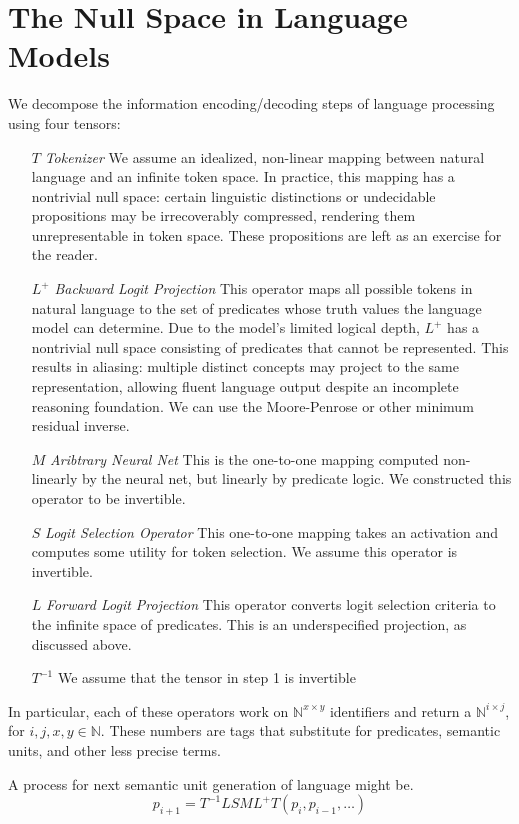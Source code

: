 \documentclass[12pt]{article}
\theoremstyle{plain}
\begin{document}
\section{The Null Space in Language Models}
We decompose the information encoding/decoding steps of language processing
using four tensors:
\begin{enumerate}
\item[$T$] \emph{Tokenizer} We assume an idealized, non-linear mapping 
 between natural language and an infinite token space. In practice, this 
 mapping has a nontrivial null space: certain linguistic distinctions or 
undecidable propositions may be irrecoverably compressed, rendering them 
unrepresentable in token space.  These propositions are left as an
        exercise for the reader.
    \item[$L^+$] \emph{Backward Logit Projection} This operator maps all 
        possible tokens in natural language to the set of 
predicates whose truth values the language model can determine. Due to the model’s 
limited logical depth, $L^+$ has a nontrivial null space consisting of predicates 
that cannot be represented. This results in aliasing: multiple distinct concepts may 
project to the same representation, allowing fluent language output despite an 
incomplete reasoning foundation. We can use the Moore-Penrose or other minimum residual inverse.
    \item[$M$] \emph{Aribtrary Neural Net} This is the one-to-one mapping computed non-linearly by the neural net, 
    but linearly by predicate logic.  We constructed this operator to be invertible.
\item[$S$] \emph{Logit Selection Operator} This one-to-one mapping takes an activation and computes some utility for 
    token selection.  We assume this operator is invertible.
\item[$L$] \emph{Forward Logit Projection}  This operator converts logit selection criteria to the
    infinite space of predicates. This is an underspecified projection, as discussed above.
\item[$T^{-1}$] We assume that the tensor in step 1 is invertible
\end{enumerate}
In particular, each of these operators work on $\mathbb{N}^{x\times y}$ identifiers
and return a $\mathbb{N}^{i\times j}$, for $i,j,x,y\in\mathbb{N}$.  These numbers are tags 
that substitute for predicates, semantic units, and other less precise terms.

A process for next semantic unit generation of language might be.
$$
p_{i+1} = T^{-1} L S M  L^+ T (p_i,p_{i-1},\ldots)
$$
\end{document}

